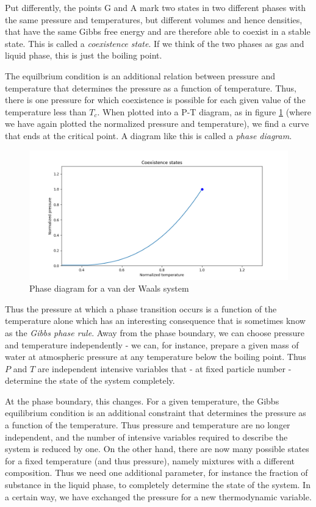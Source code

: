 \documentclass[a4paper, draft]{article}
\theoremstyle{own}
\theoremstyle{remark}
\begin{document}
Put differently, the points G and A mark two states in two different phases with the same pressure and temperatures, but different volumes and hence densities, that have the same Gibbs free energy and are therefore able to coexist in a stable state. This is called a {\em coexistence state}. If we think of the two phases as gas and liquid phase, this is just the boiling point. 

The equilbrium condition is an additional relation between pressure and temperature that determines the pressure as a function of temperature. Thus, there is one pressure for which coexistence is possible for each given value of the temperature less than $T_c$. When plotted into a P-T diagram, as in figure \ref{fig:VanDerWaalsPhaseDiagram} (where we have again plotted the normalized pressure and temperature), we find a curve that ends at the critical point. A diagram like this is called a {\em phase diagram}.

\begin{figure}[ht]
\centering
\includegraphics[scale=0.5]{VanDerWaalsPhaseDiagram}
\caption{Phase diagram for a van der Waals system}
\label{fig:VanDerWaalsPhaseDiagram}
\end{figure}
 
Thus the pressure at which a phase transition occurs is a function of the temperature alone which has an interesting consequence that is sometimes know as the {\em Gibbs phase rule}. Away from the phase boundary, we can choose pressure and temperature independently - we can, for instance, prepare a given mass of water at atmospheric pressure at any temperature below the boiling point. Thus $P$ and $T$ are independent intensive variables that - at fixed particle number - determine the state of the system completely.

At the phase boundary, this changes. For a given temperature, the Gibbs equilibrium condition is an additional constraint that determines the pressure as a function of the temperature. Thus pressure and temperature are no longer independent, and the number of intensive variables required to describe the system is reduced by one. On the other hand, there are now many possible states for a fixed temperature (and thus pressure), namely mixtures with a different composition. Thus we need one additional parameter, for instance the fraction of substance in the liquid phase, to completely determine the state of the system. In a certain way, we have exchanged the pressure for a new thermodynamic variable.
 	
\end{document}
